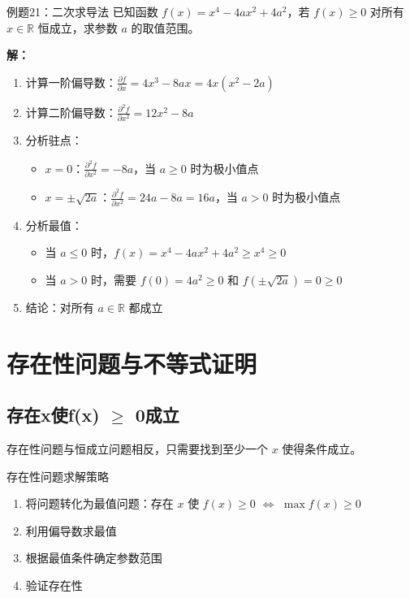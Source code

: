 \documentclass[a4paper,11pt]{ctexart}
\newcommand{\partialder}[2]{\frac{\partial #1}{\partial #2}}
\theoremstyle{definition}
\theoremstyle{remark}
\begin{document}
\begin{examplebox}{例题21：二次求导法}
已知函数 $f(x) = x^4 - 4ax^2 + 4a^2$，若 $f(x) \geq 0$ 对所有 $x \in \mathbb{R}$ 恒成立，求参数 $a$ 的取值范围。

\textbf{解：}
\begin{enumerate}
    \item 计算一阶偏导数：$\partialder{f}{x} = 4x^3 - 8ax = 4x(x^2 - 2a)$
    \item 计算二阶偏导数：$\frac{\partial^2 f}{\partial x^2} = 12x^2 - 8a$
    \item 分析驻点：
    \begin{itemize}
        \item $x = 0$：$\frac{\partial^2 f}{\partial x^2} = -8a$，当 $a \geq 0$ 时为极小值点
        \item $x = \pm\sqrt{2a}$：$\frac{\partial^2 f}{\partial x^2} = 24a - 8a = 16a$，当 $a > 0$ 时为极小值点
    \end{itemize}
    \item 分析最值：
    \begin{itemize}
        \item 当 $a \leq 0$ 时，$f(x) = x^4 - 4ax^2 + 4a^2 \geq x^4 \geq 0$
        \item 当 $a > 0$ 时，需要 $f(0) = 4a^2 \geq 0$ 和 $f(\pm\sqrt{2a}) = 0 \geq 0$
    \end{itemize}
    \item 结论：对所有 $a \in \mathbb{R}$ 都成立
\end{enumerate}
\end{examplebox}

\section{存在性问题与不等式证明}

\subsection{存在x使f(x) \texorpdfstring{$\geq$}{>=} 0成立}

存在性问题与恒成立问题相反，只需要找到至少一个 $x$ 使得条件成立。

\begin{methodbox}{存在性问题求解策略}
\begin{enumerate}
    \item 将问题转化为最值问题：存在 $x$ 使 $f(x) \geq 0$ $\Leftrightarrow$ $\max f(x) \geq 0$
    \item 利用偏导数求最值
    \item 根据最值条件确定参数范围
    \item 验证存在性
\end{enumerate}
\end{methodbox}
\end{document}
